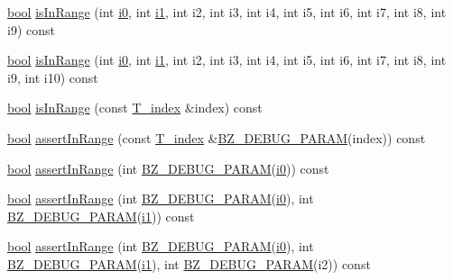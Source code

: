 \begin{DoxyCompactItemize}
\item 
\hyperlink{compiler_8h_abb452686968e48b67397da5f97445f5b}{bool} \hyperlink{classArray_a9044150868f7dae5ed3b7cc6fbde99e6}{is\+In\+Range} (int \hyperlink{cephes_8h_aacd2643d920288e61be16787561a4514}{i0}, int \hyperlink{cephes_8h_ab24474d03df1f9adf1700c2c1badd1a5}{i1}, int i2, int i3, int i4, int i5, int i6, int i7, int i8, int i9) const 
\item 
\hyperlink{compiler_8h_abb452686968e48b67397da5f97445f5b}{bool} \hyperlink{classArray_a4487c6055a182af2fbcb172e70301731}{is\+In\+Range} (int \hyperlink{cephes_8h_aacd2643d920288e61be16787561a4514}{i0}, int \hyperlink{cephes_8h_ab24474d03df1f9adf1700c2c1badd1a5}{i1}, int i2, int i3, int i4, int i5, int i6, int i7, int i8, int i9, int i10) const 
\item 
\hyperlink{compiler_8h_abb452686968e48b67397da5f97445f5b}{bool} \hyperlink{classArray_a1abdd56e997951cbbca3a7a92934adf0}{is\+In\+Range} (const \hyperlink{classArray_af3e455aedb140b84cee777ecdf2e846e}{T\+\_\+index} \&index) const 
\item 
\hyperlink{compiler_8h_abb452686968e48b67397da5f97445f5b}{bool} \hyperlink{classArray_a110673aa7e2c6530fc72fa33112ebb63}{assert\+In\+Range} (const \hyperlink{classArray_af3e455aedb140b84cee777ecdf2e846e}{T\+\_\+index} \&\hyperlink{bzdebug_8h_a8da20913b848afd5500d54e384544e20}{B\+Z\+\_\+\+D\+E\+B\+U\+G\+\_\+\+P\+A\+R\+A\+M}(index)) const 
\item 
\hyperlink{compiler_8h_abb452686968e48b67397da5f97445f5b}{bool} \hyperlink{classArray_af03f904e949df8e6575a433e8a0d1ddf}{assert\+In\+Range} (int \hyperlink{bzdebug_8h_a8da20913b848afd5500d54e384544e20}{B\+Z\+\_\+\+D\+E\+B\+U\+G\+\_\+\+P\+A\+R\+A\+M}(\hyperlink{cephes_8h_aacd2643d920288e61be16787561a4514}{i0})) const 
\item 
\hyperlink{compiler_8h_abb452686968e48b67397da5f97445f5b}{bool} \hyperlink{classArray_a9a3b768c9fd3ca9af1787334d56514e6}{assert\+In\+Range} (int \hyperlink{bzdebug_8h_a8da20913b848afd5500d54e384544e20}{B\+Z\+\_\+\+D\+E\+B\+U\+G\+\_\+\+P\+A\+R\+A\+M}(\hyperlink{cephes_8h_aacd2643d920288e61be16787561a4514}{i0}), int \hyperlink{bzdebug_8h_a8da20913b848afd5500d54e384544e20}{B\+Z\+\_\+\+D\+E\+B\+U\+G\+\_\+\+P\+A\+R\+A\+M}(\hyperlink{cephes_8h_ab24474d03df1f9adf1700c2c1badd1a5}{i1})) const 
\item 
\hyperlink{compiler_8h_abb452686968e48b67397da5f97445f5b}{bool} \hyperlink{classArray_a803193739d6a69fce9ce508c7fbf8bcf}{assert\+In\+Range} (int \hyperlink{bzdebug_8h_a8da20913b848afd5500d54e384544e20}{B\+Z\+\_\+\+D\+E\+B\+U\+G\+\_\+\+P\+A\+R\+A\+M}(\hyperlink{cephes_8h_aacd2643d920288e61be16787561a4514}{i0}), int \hyperlink{bzdebug_8h_a8da20913b848afd5500d54e384544e20}{B\+Z\+\_\+\+D\+E\+B\+U\+G\+\_\+\+P\+A\+R\+A\+M}(\hyperlink{cephes_8h_ab24474d03df1f9adf1700c2c1badd1a5}{i1}), int \hyperlink{bzdebug_8h_a8da20913b848afd5500d54e384544e20}{B\+Z\+\_\+\+D\+E\+B\+U\+G\+\_\+\+P\+A\+R\+A\+M}(i2)) const 

\end{DoxyCompactItemize}
